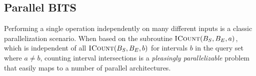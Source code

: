 \documentclass{bioinfo}
\begin{document}


        \subsection{Parallel BITS}

        Performing a single operation independently on many different inputs
        is a classic parallelization scenario.  When based on the subroutine
        $\textsc{ICount}(B_S,B_E,a)$, which is independent of all
        $\textsc{ICount}(B_S,B_E,b)$ for intervals $b$ in the query set where
        $a \neq b$, counting interval intersections is a 
        {\em pleasingly parallelizable} problem that easily maps to a 
        number of parallel architectures.
\end{document}
